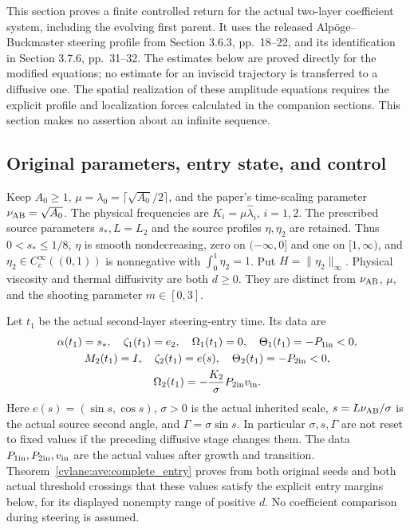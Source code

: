 This section proves a finite controlled return for the actual two-layer
coefficient system, including the evolving first parent. It uses the
released Alp\"oge--Buckmaster steering profile from Section 3.6.3,
pp.~18--22, and its identification in Section 3.7.6, pp.~31--32.
The estimates below are proved directly for the modified equations;
no estimate for an inviscid trajectory is transferred to a diffusive one.
The spatial realization of these amplitude equations requires the
explicit profile and localization forces calculated in the companion
sections. This section makes no assertion about an infinite sequence.

\subsection{Original parameters, entry state, and control}

Keep $A_0\geq1$, $\mu=\lambda_0=\lceil\sqrt{A_0}/2\rceil$,
and the paper's time-scaling parameter $\nu_{\rm AB}=\sqrt{A_0}$.
The physical frequencies are $K_i=\mu\widehat\lambda_i$, $i=1,2$.
The prescribed source parameters $s_*,L=L_2$ and the source profiles
$\eta,\eta_2$ are retained. Thus $0<s_*\leq1/8$,
$\eta$ is smooth nondecreasing, zero on $(-\infty,0]$ and one on
$[1,\infty)$, and $\eta_2\in C_c^\infty((0,1))$ is nonnegative with
$\int_0^1\eta_2=1$. Put $H=\|\eta_2\|_\infty$.
Physical viscosity and thermal diffusivity are both $d\geq0$.
They are distinct from $\nu_{\rm AB}$, $\mu$, and the shooting parameter
$m\in[0,3]$.

Let $t_1$ be the actual second-layer steering-entry time. Its data are
\begin{equation}\label{cvlane:sr:entry}
 \begin{gathered}
 \alpha(t_1)=s_*,\quad \zeta_1(t_1)=e_2,\quad
 \Omega_1(t_1)=0,\quad \Theta_1(t_1)=-P_{1\rm in}<0,\\
 M_2(t_1)=I,\quad \zeta_2(t_1)=e(s),\quad
 \Theta_2(t_1)=-P_{2\rm in}<0,\\
 \Omega_2(t_1)=-\frac{K_2}{\sigma}P_{2\rm in}v_{\rm in}.
 \end{gathered}
\end{equation}
Here $e(s)=(\sin s,\cos s)$, $\sigma>0$ is the actual inherited scale,
$s=L\nu_{\rm AB}/\sigma$ is the actual source second angle, and
$\Gamma=\sigma\sin s$. In particular $\sigma,s,\Gamma$ are not
reset to fixed values if the preceding diffusive stage changes them.
The data $P_{1\rm in},P_{2\rm in},v_{\rm in}$ are the actual values
after growth and transition. Theorem~\ref{cvlane:ave:complete_entry} proves
from both original seeds and both actual threshold crossings that these
values satisfy the explicit entry margins below, for its displayed
nonempty range of positive $d$. No coefficient comparison during
steering is assumed.

